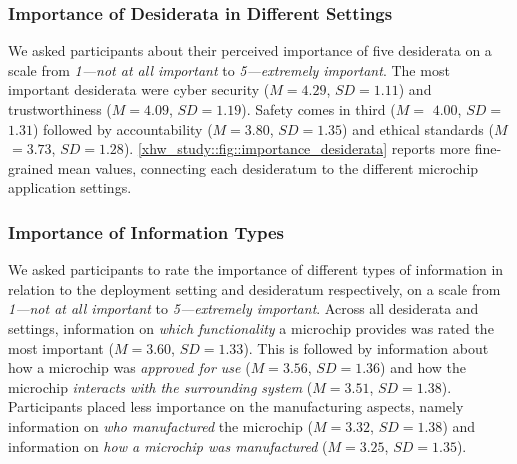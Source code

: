 \subsubsection{Importance of Desiderata in Different Settings}
\label{xhw_study::subsubsec::desiderata_importance}
We asked participants about their perceived importance of five desiderata on a scale from \textit{1---not at all important} to \textit{5---extremely important}. 
The most important desiderata were cyber security ($M$$=$$4.29$, $SD$$=$$1.11$) and trustworthiness ($M$$=$$4.09$, $SD$$=$$1.19$). 
Safety comes in third ($M$$=$ $4.00$, $SD$$=$$1.31$) followed by accountability ($M$$=$$3.80$, $SD$$=$$1.35$) and ethical standards ($M$$=$$3.73$, $SD$$=$$1.28$).
\autoref{xhw_study::fig::importance_desiderata} reports more fine-grained mean values, connecting each desideratum to the different microchip application settings.

\subsubsection{Importance of Information Types}
We asked participants to rate the importance of different types of information in relation to the deployment setting and desideratum respectively, on a scale from \textit{1---not at all important} to \textit{5---extremely important}. 
Across all desiderata and settings, information on \textit{which functionality} a microchip provides was rated the most important ($M$$=$$3.60$, $SD$$=$$1.33$).
This is followed by information about how a microchip was \textit{approved for use} ($M$$=$$3.56$, $SD$$=$$1.36$) and how the microchip \textit{interacts with the surrounding system} ($M$$=$$3.51$, $SD$$=$$1.38$).
Participants placed less importance on the manufacturing aspects, namely information on \textit{who manufactured} the microchip ($M$$=$$3.32$, $SD$$=$$1.38$) 
and information on \textit{how a microchip was manufactured} ($M$$=$$3.25$, $SD$$=$$1.35$).

\infsetairplane

\infsetcar


